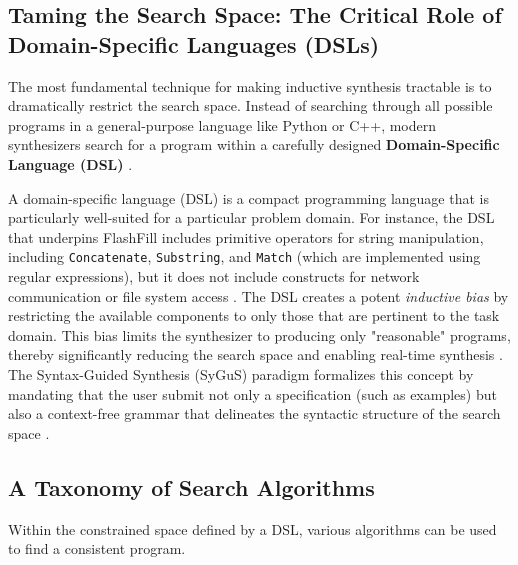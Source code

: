\documentclass[12pt, a4paper]{report}
\begin{document}
\subsection{Taming the Search Space: The Critical Role of Domain-Specific Languages (DSLs)}

The most fundamental technique for making inductive synthesis tractable is to dramatically restrict the search space. Instead of searching through all possible programs in a general-purpose language like Python or C++, modern synthesizers search for a program within a carefully designed \textbf{Domain-Specific Language (DSL)} \citep{gulwani2011automating}.

A domain-specific language (DSL) is a compact programming language that is particularly well-suited for a particular problem domain. For instance, the DSL that underpins FlashFill includes primitive operators for string manipulation, including \texttt{Concatenate}, \texttt{Substring}, and \texttt{Match} (which are implemented using regular expressions), but it does not include constructs for network communication or file system access \citep{gulwani2012dimensions}. The DSL creates a potent \textit{inductive bias} \citep{summers1977methodology} by restricting the available components to only those that are pertinent to the task domain. This bias limits the synthesizer to producing only "reasonable" programs, thereby significantly reducing the search space and enabling real-time synthesis \citep{gulwani2011automating}. The Syntax-Guided Synthesis (SyGuS) paradigm formalizes this concept by mandating that the user submit not only a specification (such as examples) but also a context-free grammar that delineates the syntactic structure of the search space \citep{alur2013syntax}.

\subsection{A Taxonomy of Search Algorithms}

Within the constrained space defined by a DSL, various algorithms can be used to find a consistent program.
\end{document}
